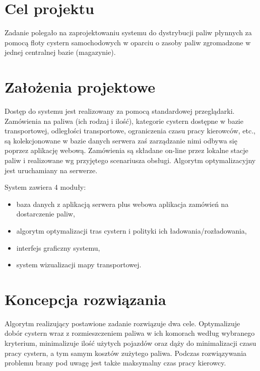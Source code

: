 \documentclass[11pt,a4paper,oneside]{mwart}
\begin{document}


\newpage
\thispagestyle{empty}
\newpage

\setcounter{tocdepth}{3}
\tableofcontents
\newpage


\section{Cel projektu}
Zadanie polegało na zaprojektowaniu systemu do dystrybucji paliw płynnych za pomocą floty cystern samochodowych w oparciu o zasoby paliw zgromadzone w jednej centralnej bazie (magazynie).

\section{Założenia projektowe}
Dostęp do systemu jest realizowany za pomocą standardowej przeglądarki. Zamówienia na paliwa (ich rodzaj i ilość), kategorie cystern dostępne w bazie transportowej, odległości transportowe, ograniczenia czasu pracy kierowców, etc., są kolekcjonowane w bazie danych serwera zaś zarządzanie nimi odbywa się poprzez aplikację webową. Zamówienia są składane on-line przez lokalne stacje paliw i realizowane wg przyjętego scenariusza obsługi. Algorytm optymalizacyjny jest uruchamiany na serwerze.

System zawiera 4 moduły: 
\begin{itemize}
  \item baza danych z aplikacją serwera plus webowa aplikacja zamówień na dostarczenie paliw, 
  \item algorytm optymalizacji tras cystern i polityki ich ładowania/rozładowania, 
  \item interfejs graficzny systemu, 
  \item system wizualizacji mapy transportowej.
\end{itemize}


\section {Koncepcja rozwiązania}

Algorytm realizujący postawione zadanie rozwiązuje dwa cele. Optymalizuje dobór cystern wraz z rozmieszczeniem paliwa w ich komorach według wybranego kryterium, minimalizuje ilość użytych pojazdów oraz dąży do minimalizacji czasu pracy cystern, a tym samym kosztów zużytego paliwa. Podczas rozwiązywania problemu brany pod uwagę jest także maksymalny czas pracy kierowcy.
\end{document}
